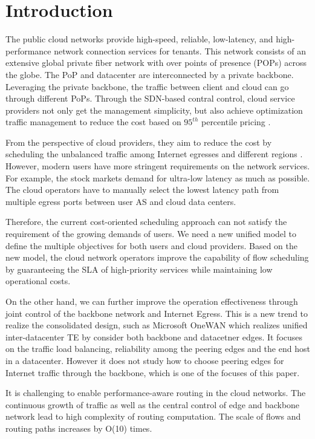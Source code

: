 \section{Introduction}
The public cloud networks provide high-speed, reliable, low-latency, and high-performance network connection services for tenants. This network consists of an extensive global private fiber network with over points of presence (POPs) across the globe. The PoP and datacenter are interconnected by a private backbone. Leveraging the private backbone, the traffic between client and cloud can go through different PoPs. Through the SDN-based contral control, cloud service providers not only get the management simplicity, but also achieve optimization traffic management to reduce the cost based on $95^{th}$ percentile pricing \cite{hong2013achieving,singh2021costCascara}. 

From the perspective of cloud providers, they aim to reduce the cost by scheduling the unbalanced traffic among Internet egresses and different regions \cite{yap2017espresso,schlinker2017edgefabric,casado2012fabric}. 
However, modern users have more stringent requirements on the network services. For example, the stock markets demand for ultra-low latency as much as possible. The cloud operators have to manually select the lowest latency path from multiple egress ports between user AS and cloud data centers.  


Therefore, the current cost-oriented scheduling approach can not satisfy the requirement of the growing demands of users. We need a new unified model to define the multiple objectives for both users and cloud providers. Based on the new model, the cloud network operators improve the capability of flow scheduling by guaranteeing the SLA of high-priority services while maintaining low operational costs.

On the other hand, we can further improve the operation effectiveness through joint control of the backbone network and Internet Egress. This is a new trend to realize the consolidated design, such as Microsoft OneWAN \cite{krishnaswamy2023onewan} which realizes unified inter-datacenter TE by consider both backbone and datacetner edges. It focuses on the traffic load balancing, reliability among the peering edges and the end host in a datacenter. However it does not study how to choose peering edges for Internet traffic through the backbone, which is one of the focuses of  this paper.

It is challenging to enable performance-aware routing in the cloud networks. The continuous growth of traffic as well as the central control of edge and backbone network lead to high complexity of routing computation. The scale of flows and routing paths increases by O(10) times. %

